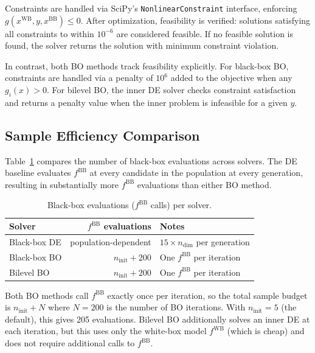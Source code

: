\documentclass[12pt,a4paper]{article}%
\theoremstyle{plain}%
\theoremstyle{remark}%
\theoremstyle{definition}%
\def\WB{\mathrm{WB}}
\def\BB{\mathrm{BB}}
\begin{document}
\begin{appendices}
Constraints are handled via SciPy's \texttt{NonlinearConstraint} interface, enforcing $g(x^{\WB}, y, x^{\BB}) \leq 0$. After optimization, feasibility is verified: solutions satisfying all constraints to within $10^{-6}$ are considered feasible. If no feasible solution is found, the solver returns the solution with minimum constraint violation.

In contrast, both BO methods track feasibility explicitly. For black-box BO, constraints are handled via a penalty of $10^6$ added to the objective when any $g_i(x) > 0$. For bilevel BO, the inner DE solver checks constraint satisfaction and returns a penalty value when the inner problem is infeasible for a given $y$.

\subsection{Sample Efficiency Comparison}\label{subsec:de_sample_efficiency}

Table~\ref{tab:sample_efficiency} compares the number of black-box evaluations across solvers. The DE baseline evaluates $f^{\BB}$ at every candidate in the population at every generation, resulting in substantially more $f^{\BB}$ evaluations than either BO method.

\begin{table}[htbp]
\centering
\caption{Black-box evaluations ($f^{\BB}$ calls) per solver.}
\label{tab:sample_efficiency}
\begin{tabular}{@{}lrl@{}}
\toprule
\textbf{Solver} & \textbf{$f^{\BB}$ evaluations} & \textbf{Notes} \\
\midrule
Black-box DE & population-dependent & $15 \times n_\text{dim}$ per generation \\
Black-box BO & $n_\text{init} + 200$ & One $f^{\BB}$ per iteration \\
Bilevel BO & $n_\text{init} + 200$ & One $f^{\BB}$ per iteration \\
\bottomrule
\end{tabular}
\end{table}

Both BO methods call $f^{\BB}$ exactly once per iteration, so the total sample budget is $n_\text{init} + N$ where $N=200$ is the number of BO iterations. With $n_\text{init} = 5$ (the default), this gives 205 evaluations. Bilevel BO additionally solves an inner DE at each iteration, but this uses only the white-box model $f^{\WB}$ (which is cheap) and does not require additional calls to $f^{\BB}$.


\end{appendices}
\end{document}
